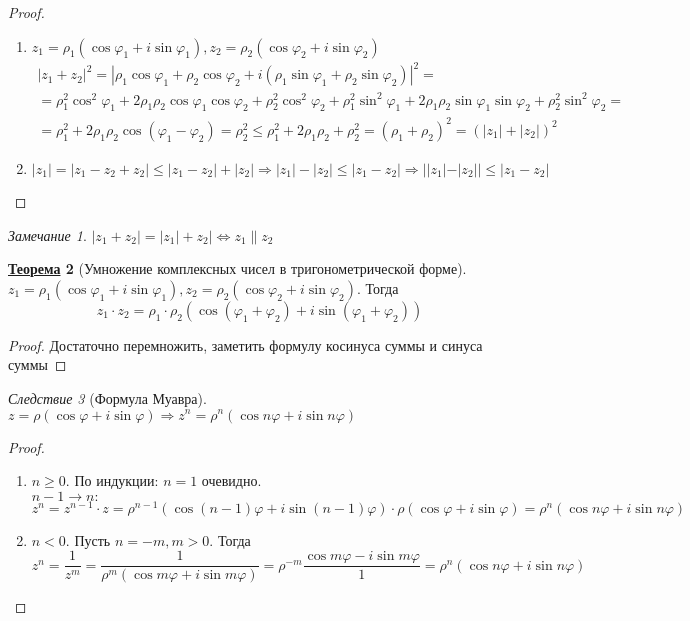 \documentclass[12pt]{article}
\newenvironment{MyList}[1][4pt]{
  \begin{enumerate}[1.]
  \setlength{\parskip}{0pt}
  \setlength{\itemsep}{#1}
}{       
  \end{enumerate}
}
\def\PHI{\varphi}        %
\def\SO{\Rightarrow}     %
\def\EQ{\Leftrightarrow} %
\def\Pagebreak{\pagebreak\vspace*{-1.5em}}
\theoremstyle{definition} %
\newtheorem{Thm}{\underline{Теорема}}[subsection] %
\theoremstyle{plain} %
\theoremstyle{remark} %
\newtheorem{Cons}[Thm]{Следствие} %
\newtheorem{Rem}[Thm]{Замечание} %
\begin{document}
\begin{proof}
    \begin{MyList}
        \item $z_1 = \rho_1(\cos \PHI_1 + i\sin \PHI_1), z_2 = \rho_2(\cos \PHI_2 + i\sin \PHI_2)$ \\
        \begin{gather*}
            |z_1 + z_2|^2 = |\rho_1 \cos \PHI_1 + \rho_2 \cos \PHI_2 + i(\rho_1 \sin \PHI_1 + \rho_2 \sin \PHI_2)|^2 = \\
            = \rho_1^2 \cos^2 \PHI_1 + 2 \rho_1 \rho_2 \cos \PHI_1 \cos \PHI_2 + \rho_2^2 \cos^2 \PHI_2 + \rho_1^2 \sin^2 \PHI_1 + 2 \rho_1 \rho_2 \sin \PHI_1 \sin \PHI_2 + \rho_2^2 \sin^2 \PHI_2 = \\
            = \rho_1^2 + 2\rho_1 \rho_2 \cos(\PHI_1 - \PHI_2) = \rho_2^2 \leqslant \rho_1^2 + 2\rho_1 \rho_2 + \rho_2^2 = (\rho_1 + \rho_2)^2 = (|z_1| + |z_2|)^2
        \end{gather*}

        \item \[
            |z_1| = |z_1 - z_2 + z_2| \leqslant |z_1 - z_2| + |z_2| \SO |z_1| - |z_2| \leqslant |z_1 - z_2| \SO ||z_1| - |z_2|| \leqslant |z_1 - z_2|
        \]
    \end{MyList}
\end{proof}

\begin{Rem}
    $|z_1 + z_2| = |z_1| + z_2| \EQ z_1 \parallel z_2$ 
\end{Rem}

\Pagebreak
\begin{Thm}[Умножение комплексных чисел в тригонометрической форме]
    $z_1 = \rho_1 (\cos \PHI_1 + i\sin \PHI_1), z_2 = \rho_2 (\cos \PHI_2 + i\sin \PHI_2)$. Тогда 
    \[z_1 \cdot z_2 = \rho_1 \cdot \rho_2 (\cos (\PHI_1 + \PHI_2) + i\sin (\PHI_1 + \PHI_2))\] 
\end{Thm}

\begin{proof}
    Достаточно перемножить, заметить формулу косинуса суммы и синуса суммы
\end{proof}

\begin{Cons}[Формула Муавра]
    $z = \rho (\cos \PHI + i\sin \PHI) \SO z^n = \rho^n(\cos n\PHI + i\sin n\PHI)$ 
\end{Cons}

\begin{proof}
    \begin{MyList}
        \item $n \geqslant 0$. По индукции: $n = 1$ очевидно. \\
        $n - 1 \to n:$
        \[z^n = z^{n - 1} \cdot z = \rho^{n - 1}(\cos (n - 1)\PHI + i\sin(n - 1)\PHI) \cdot \rho(\cos \PHI + i\sin\PHI) = \rho^n(\cos n\PHI + i\sin n\PHI)\] 

        \item $n < 0$. Пусть $n = -m, m > 0$. Тогда
        \[z^n = \frac{1}{z^m} = \frac{1}{\rho^m(\cos m\PHI + i\sin m\PHI)} = \rho^{-m} \frac{\cos m\PHI - i\sin m\PHI}{1} = \rho^n (\cos n\PHI + i\sin n\PHI)\]
    \end{MyList}
\end{proof}
\end{document}
